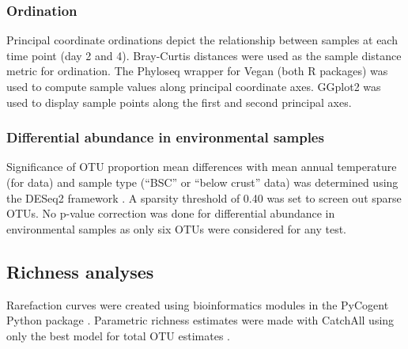 \subsubsection{Ordination}
Principal coordinate ordinations depict the relationship between samples at
each time point (day 2 and 4). Bray-Curtis distances were used as the sample
distance metric for ordination. The Phyloseq \citep{24699258} wrapper for Vegan
\citep{vegan} (both R packages) was used to compute sample values along
principal coordinate axes. GGplot2 \citep{ggplot2} was used to display sample
points along the first and second principal axes.  

\subsubsection{Differential abundance in environmental samples}
Significance of OTU proportion mean differences with mean annual temperature
(for \citet{Garcia_Pichel_2013} data) and sample type (``BSC'' or ``below crust''
\citet{Steven_2013} data) was determined using the DESeq2 framework
\citep{24699258, Love_2014}. A sparsity threshold of 0.40 was set to screen out
sparse OTUs. No p-value correction was done for differential abundance in 
environmental samples as only six OTUs were considered for any test.

\subsection{Richness analyses} Rarefaction curves were created using
bioinformatics modules in the PyCogent Python package \citep{Knight_2007}.
Parametric richness estimates were made with CatchAll using only the best model
for total OTU estimates \citep{BUNGE_2010}.
